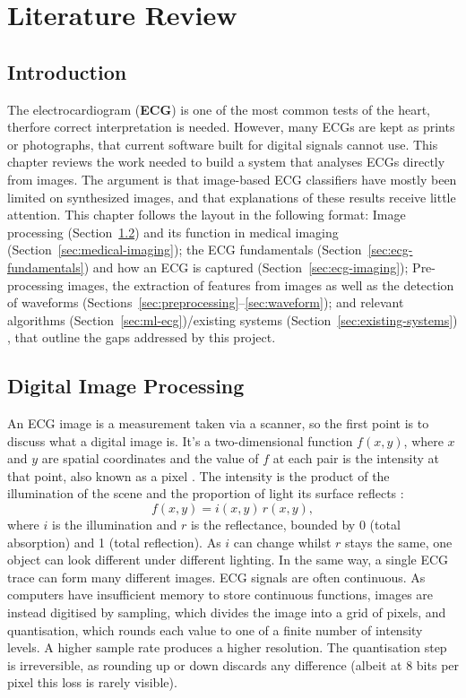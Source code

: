\chapter{Literature Review}
\label{ch:lit}
\section{Introduction}

The electrocardiogram (\textbf{ECG}) is one of the most common tests of the
heart, therfore correct interpretation is needed. However, many ECGs are kept as
prints or photographs, that  current software built for digital signals cannot use.
This chapter reviews the work needed to build a system that analyses ECGs directly
from images. The argument is that image-based ECG classifiers have mostly been limited on synthesized images, and that explanations of these results receive little attention. This chapter follows the layout in the following format: Image processing
(Section~\ref{sec:image-processing}) and its function in medical imaging
(Section~\ref{sec:medical-imaging}); the ECG fundamentals (Section~\ref{sec:ecg-fundamentals})
and how an ECG is captured (Section~\ref{sec:ecg-imaging}); Pre-processing
images, the extraction of features from images as well as the detection of waveforms (Sections~\ref{sec:preprocessing}--\ref{sec:waveform}); and relevant algorithms
(Section~\ref{sec:ml-ecg})/existing systems (Section~\ref{sec:existing-systems})
, that outline the gaps addressed by this project.
\section{Digital Image Processing}
\label{sec:image-processing}
An ECG image is a measurement taken via a scanner, so the first point is to discuss what a digital image is. It's a two-dimensional function $f(x,y)$, where $x$ and $y$ are
spatial coordinates and the value of $f$ at each pair is the intensity at that
point, also known as a pixel \cite{gonzalez_digital_2018}. The intensity is the product of the
illumination of the scene and the proportion of light its surface reflects
\cite{stockham_image_1972}: \[f(x,y) = i(x,y)\,r(x,y),\]
where $i$ is the illumination and $r$ is the reflectance, bounded by 0 (total
absorption) and 1 (total reflection). As $i$ can change whilst $r$ stays the
same, one object can look different under different lighting. In the same way, a single ECG
trace can form many different images. ECG signals are often continuous. As computers have insufficient memory to store continuous
functions, images are instead digitised by sampling, which divides the image into a grid
of pixels, and quantisation, which rounds each value to one of a finite number of
intensity levels. A higher sample rate produces a higher resolution. The quantisation step is irreversible, as rounding up or down discards any difference (albeit at 8 bits per pixel
this loss is rarely visible)\cite{gonzalez_digital_2018}.

